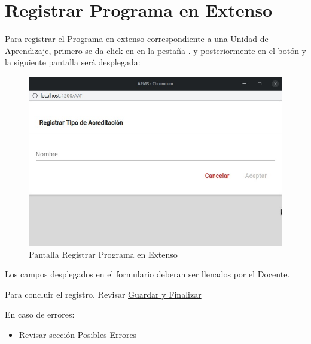 \section{Registrar Programa en Extenso}

Para registrar el Programa en extenso correspondiente a una Unidad de Aprendizaje, primero se da click en en la pestaña . y posteriormente en el botón  y la siguiente pantalla será desplegada:

\begin{figure}[H]
    \centering
    \hypertarget{9}{\includegraphics[width=0.5\linewidth]{images/SP6/9.jpeg}}
    \caption{Pantalla Registrar Programa en Extenso}
\end{figure}

Los campos desplegados en el formulario deberan ser llenados por el Docente.

Para concluir el registro. Revisar \hyperlink{GuardarFinalizar}{Guardar y Finalizar}

En caso de errores:
    \begin{itemize}
        \item Revisar sección \hyperlink{Errores}{Posibles Errores}
    \end{itemize}
